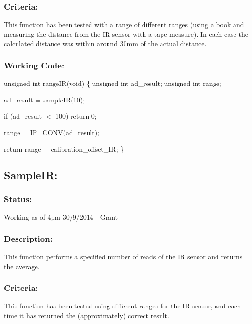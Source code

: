 \documentclass[]{article}
\begin{document}
\subsubsection{Criteria:}
This function has been tested with a range of different ranges (using a book and measuring the distance from the IR sensor with a tape measure). In each case the calculated distance was within around 30mm of the actual distance.

\subsubsection{Working Code:}
unsigned int rangeIR(void) \newline
\{ \newline
	unsigned int ad\_result; \newline
	unsigned int range; \newline
	
	ad\_result = sampleIR(10); \newline
	
	if (ad\_result $<$ 100) return 0; \newline
	
	range = IR\_CONV(ad\_result); \newline
	
	return range + calibration\_offset\_IR; \newline
\} \newline

\subsection{SampleIR:}
\subsubsection{Status:}
Working as of 4pm 30/9/2014 - Grant

\subsubsection{Description:}
This function performs a specified number of reads of the IR sensor and returns the average.

\subsubsection{Criteria:}
This function has been tested using different ranges for the IR sensor, and each time it has returned the (approximately) correct result.
\end{document}
